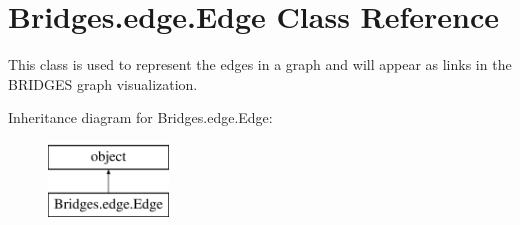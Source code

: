 \hypertarget{class_bridges_1_1edge_1_1_edge}{}\section{Bridges.\+edge.\+Edge Class Reference}
\label{class_bridges_1_1edge_1_1_edge}


This class is used to represent the edges in a graph and will appear as links in the B\+R\+I\+D\+G\+ES graph visualization.  


Inheritance diagram for Bridges.\+edge.\+Edge\+:\begin{figure}[H]
\begin{center}
\leavevmode
\includegraphics[height=2.000000cm]{class_bridges_1_1edge_1_1_edge}
\end{center}
\end{figure}
